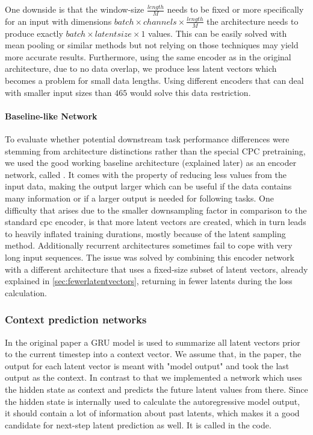 
One downside is that the window-size $\frac{length}{M}$ needs to be fixed or more specifically for an input with dimensions $batch \times channels \times \frac{length}{M}$ the architecture needs to produce exactly $batch \times latentsize \times 1$ values. This can be easily solved with mean pooling or similar methods but not relying on those techniques may yield more accurate results. 
Furthermore, using the same encoder as in the original architecture, due to no data overlap, we produce less latent vectors which becomes a problem for small data lengths. Using different encoders that can deal with smaller input sizes than $465$ would solve this data restriction.
\paragraph{Baseline-like Network}
To evaluate whether potential downstream task performance differences were stemming from architecture distinctions rather than the special CPC pretraining, we used the good working baseline architecture  (explained later) as an encoder network, called . It comes with the property of reducing less values from the input data, making the output larger which can be useful if the data contains many information or if a larger output is needed for following tasks. One difficulty that arises due to the smaller downsampling factor in comparison to the standard cpc encoder, is that more latent vectors are created, which in turn leads to heavily inflated training durations, mostly because of the latent sampling method. Additionally recurrent architectures sometimes fail to cope with very long input sequences. The issue was solved by combining this encoder network with a different architecture that uses a fixed-size subset of latent vectors, already explained in \autoref{sec:fewerlatentvectors}, returning in fewer latents during the loss calculation.

\subsubsection{Context prediction networks}
In the original paper a GRU model is used to summarize all latent vectors prior to the current timestep into a context vector. We assume that, in the paper, the output for each latent vector is meant with "model output" and took the last output as the context. In contrast to that we implemented a network which uses the hidden state as context and predicts the future latent values from there. Since the hidden state is internally used to calculate the autoregressive model output, it should contain a lot of information about past latents, which makes it a good candidate for next-step latent prediction as well. It is called  in the code.

